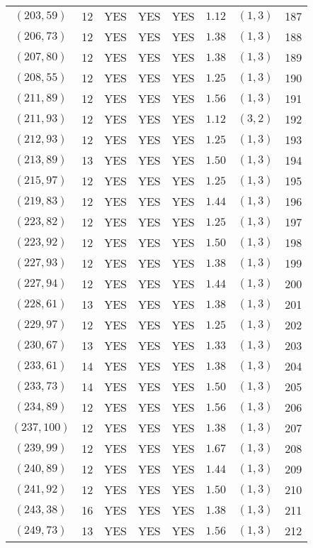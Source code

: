 \begin{longtable}{|c|c|c|c|c|c|c|c|}
$(203,59)$ & 12 & YES & YES & YES & $1.12$ & $(1,3)$ & 187\\
$(206,73)$ & 12 & YES & YES & YES & $1.38$ & $(1,3)$ & 188\\
$(207,80)$ & 12 & YES & YES & YES & $1.38$ & $(1,3)$ & 189\\
$(208,55)$ & 12 & YES & YES & YES & $1.25$ & $(1,3)$ & 190\\
$(211,89)$ & 12 & YES & YES & YES & $1.56$ & $(1,3)$ & 191\\
$(211,93)$ & 12 & YES & YES & YES & $1.12$ & $(3,2)$ & 192\\
$(212,93)$ & 12 & YES & YES & YES & $1.25$ & $(1,3)$ & 193\\
$(213,89)$ & 13 & YES & YES & YES & $1.50$ & $(1,3)$ & 194\\
$(215,97)$ & 12 & YES & YES & YES & $1.25$ & $(1,3)$ & 195\\
$(219,83)$ & 12 & YES & YES & YES & $1.44$ & $(1,3)$ & 196\\
$(223,82)$ & 12 & YES & YES & YES & $1.25$ & $(1,3)$ & 197\\
$(223,92)$ & 12 & YES & YES & YES & $1.50$ & $(1,3)$ & 198\\
$(227,93)$ & 12 & YES & YES & YES & $1.38$ & $(1,3)$ & 199\\
$(227,94)$ & 12 & YES & YES & YES & $1.44$ & $(1,3)$ & 200\\
$(228,61)$ & 13 & YES & YES & YES & $1.38$ & $(1,3)$ & 201\\
$(229,97)$ & 12 & YES & YES & YES & $1.25$ & $(1,3)$ & 202\\
$(230,67)$ & 13 & YES & YES & YES & $1.33$ & $(1,3)$ & 203\\
$(233,61)$ & 14 & YES & YES & YES & $1.38$ & $(1,3)$ & 204\\
$(233,73)$ & 14 & YES & YES & YES & $1.50$ & $(1,3)$ & 205\\
$(234,89)$ & 12 & YES & YES & YES & $1.56$ & $(1,3)$ & 206\\
$(237,100)$ & 12 & YES & YES & YES & $1.38$ & $(1,3)$ & 207\\
$(239,99)$ & 12 & YES & YES & YES & $1.67$ & $(1,3)$ & 208\\
$(240,89)$ & 12 & YES & YES & YES & $1.44$ & $(1,3)$ & 209\\
$(241,92)$ & 12 & YES & YES & YES & $1.50$ & $(1,3)$ & 210\\
$(243,38)$ & 16 & YES & YES & YES & $1.38$ & $(1,3)$ & 211\\
$(249,73)$ & 13 & YES & YES & YES & $1.56$ & $(1,3)$ & 212\\

\end{longtable}
